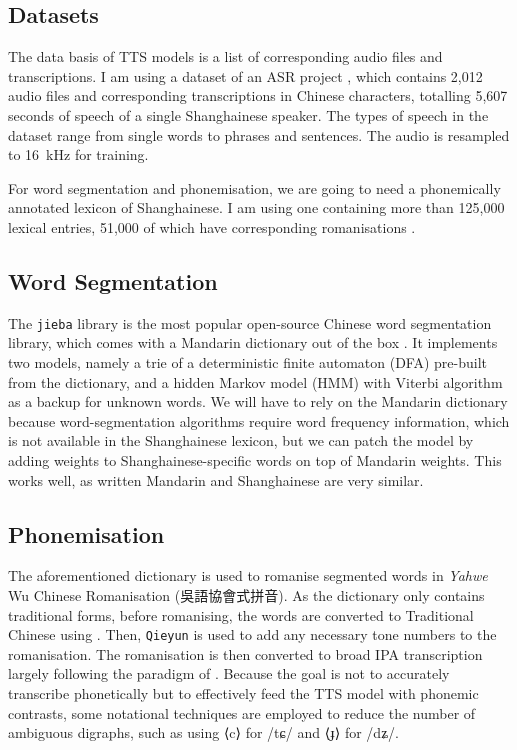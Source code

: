 \documentclass[11pt]{article}
\begin{document}
\subsection{Datasets}
The data basis of TTS models is a list of corresponding audio files and transcriptions.
I am using a dataset of an ASR project \citep{cosmos-breakCosmosBreakAsr2023}, which contains 2,012 audio files and corresponding transcriptions in Chinese characters, totalling 5,607 seconds of speech of a single Shanghainese speaker. The types of speech in the dataset range from single words to phrases and sentences.
The audio is resampled to \qty{16}{kHz} for training.

For word segmentation and phonemisation, we are going to need a phonemically annotated lexicon of Shanghainese. I am using one containing more than 125,000 lexical entries, 51,000 of which have corresponding romanisations \citep{yuanhaochenRimeYahweZaonhe2022}.

\subsection{Word Segmentation}
The \texttt{jieba} library is the most popular open-source Chinese word segmentation library, which comes with a Mandarin dictionary out of the box \citep{junyiJieba2023}.
It implements two models, namely a trie of a deterministic finite automaton (DFA) pre-built from the dictionary, and a hidden Markov model (HMM) with Viterbi algorithm as a backup for unknown words.
We will have to rely on the Mandarin dictionary because word-segmentation algorithms require word frequency information, which is not available in the Shanghainese lexicon, but we can patch the model by adding weights to Shanghainese-specific words on top of Mandarin weights. This works well, as written Mandarin and Shanghainese are very similar.

\subsection{Phonemisation}
The aforementioned dictionary \citep{yuanhaochenRimeYahweZaonhe2022} is used to romanise segmented words in \emph{Yahwe} Wu Chinese Romanisation (吳語協會式拼音).
As the dictionary only contains traditional forms, before romanising, the words are converted to Traditional Chinese using \citet{kuoOpenChineseConvert2023}.
Then, \texttt{Qieyun} \citep{Qieyunpython2022} is used to add any necessary tone numbers to the romanisation.
The romanisation is then converted to broad IPA transcription largely following the paradigm of \citet{qianShanghaiFangYan2007}. Because the goal is not to accurately transcribe phonetically but to effectively feed the TTS model with phonemic contrasts, some notational techniques are employed to reduce the number of ambiguous digraphs, such as using ⟨c⟩ for /tɕ/ and ⟨ɟ⟩ for /dʑ/.
\end{document}
